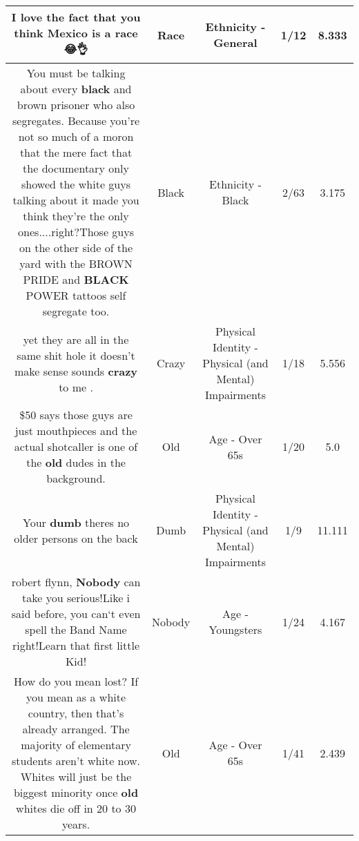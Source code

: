 \documentclass[11pt]{article}
\newlength\mylength
\begin{document}
\begin{center}
\begin{longtable}{|C{.65\mylength}|C{.30\mylength}|C{.12\mylength}|C{.12\mylength}|C{.12\mylength}|}
  \small I love the fact that you think Mexico is a \textbf{race} 😂👌\normalsize   & Race & Ethnicity - General & 1/12 & 8.333 \\  \hline
  \small You must be talking about every \textbf{black} and brown prisoner who also segregates. Because you're not so much of a moron that the mere fact that the documentary only showed the white guys talking about it made you think they're the only ones....right?Those guys on the other side of the yard with the BROWN PRIDE and \textbf{BLACK} POWER tattoos self segregate too.\normalsize   & Black & Ethnicity - Black & 2/63 & 3.175 \\  \hline
  \small yet they are all in the same shit hole it doesn't make sense sounds \textbf{crazy} to me .\normalsize   & Crazy & Physical Identity - Physical (and Mental) Impairments & 1/18 & 5.556 \\  \hline
  \small \$50 says those guys are just mouthpieces and the actual shotcaller is one of the \textbf{old} dudes in the background.\normalsize   & Old & Age - Over 65s & 1/20 & 5.0 \\  \hline
  \small Your \textbf{dumb} theres no older persons on the back\normalsize   & Dumb & Physical Identity - Physical (and Mental) Impairments & 1/9 & 11.111 \\  \hline
  \small robert flynn, \textbf{Nobody} can take you serious!Like i said before, you can‘t even spell the Band Name right!Learn that first little Kid!\normalsize   & Nobody & Age - Youngsters & 1/24 & 4.167 \\  \hline
  \small How do you mean lost? If you mean as a white country, then that's already arranged. The majority of elementary students aren't white now. Whites will just be the biggest minority once \textbf{old} whites die off in 20 to 30 years.\normalsize   & Old & Age - Over 65s & 1/41 & 2.439 \\  \hline

\end{longtable}
\end{center}
\end{document}
